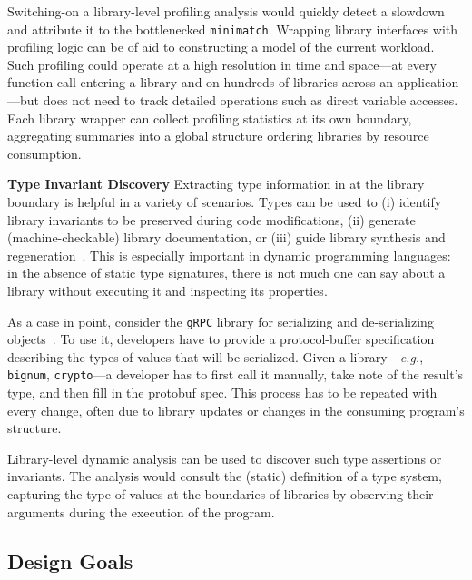 \documentclass[letterpaper,twocolumn,10pt]{article}
\def\eg{{\em e.g.}, }
\newcommand{\heading}[1]{\vspace{2pt}\noindent\textbf{#1}\enspace}
\newcommand{\ttt}[1]{\texttt{#1}}
\begin{document}
Switching-on a library-level profiling analysis 
  would quickly detect a slowdown and attribute it to the bottlenecked \ttt{minimatch}.
Wrapping library interfaces with profiling logic can be of aid to constructing a model of the current workload.
Such profiling could operate at a high resolution in time and space---at every function call entering a library and on hundreds of libraries across an application---but does not need to track detailed operations such as direct variable accesses.
Each library wrapper can collect profiling statistics at its own boundary, aggregating summaries into a global structure ordering libraries by resource consumption.

\heading{Type Invariant Discovery}
Extracting type information in at the library boundary is helpful in a variety of scenarios. %
Types can be used to
  (i) identify library invariants to be preserved during code modifications,
  (ii) generate (machine-checkable) library documentation, or 
  (iii) guide library synthesis and regeneration~\cite{daikon}.
This is especially important in dynamic programming languages:
  in the absence of static type signatures, there is not much one can say about a library without executing it and inspecting its properties.

As a case in point, consider the \ttt{gRPC} library for serializing and de-serializing objects~\cite{grpc}.
To use it, developers have to provide a protocol-buffer specification describing the types of values that will be serialized.
Given a library---\eg \ttt{bignum}, \ttt{crypto}---a developer has to first call it manually, take note of the result's type, and then fill in the protobuf spec.
This process has to be repeated with every change, often due to library updates or changes in the consuming program's structure.

Library-level dynamic analysis can be used to discover such type assertions or invariants.
The analysis would consult the (static) definition of a type system, capturing the type of values at the boundaries of libraries by observing their arguments during the execution of the program.

\subsection{Design Goals}
\label{goals}
\end{document}
